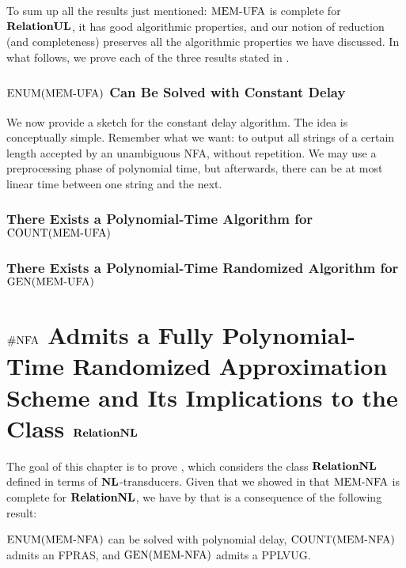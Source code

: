 \documentclass[11pt,twoside=off,numbers=noenddot]{scrbook}
\begin{document}
To sum up all the results just mentioned: $\text{MEM-UFA}$ is complete for $\textbf{RelationUL}$, it has good algorithmic properties, and our notion of reduction (and completeness) preserves all the algorithmic properties we have discussed. In what follows, we prove each of the three results stated in .

\subsection{$\text{ENUM}(\text{MEM-UFA})$ Can Be Solved with Constant Delay}
We now provide a sketch for the constant delay algorithm. The idea is conceptually simple. Remember what we want: to output all strings of a certain length accepted by an unambiguous NFA, without repetition. We may use a preprocessing phase of polynomial time, but afterwards, there can be at most linear time between one string and the next.

\subsection{There Exists a Polynomial-Time Algorithm for $\text{COUNT}(\text{MEM-UFA})$}

\subsection{There Exists a Polynomial-Time Randomized Algorithm for $\text{GEN}(\text{MEM-UFA})$}

\chapter{$\text{\#NFA}$ Admits a Fully Polynomial-Time Randomized Approximation Scheme and Its Implications to the Class $\textbf{RelationNL}$}
The goal of this chapter is to prove , which considers the class $\textbf{RelationNL}$ defined in terms of $\textbf{NL}$-transducers. Given that we showed in  that $\text{MEM-NFA}$ is complete for $\textbf{RelationNL}$, we have by  that  is a consequence of the following result:

\begin{theorem}
    $\text{ENUM}(\text{MEM-NFA})$ can be solved with polynomial delay, $\text{COUNT}(\text{MEM-NFA})$ admits an FPRAS, and $\text{GEN}(\text{MEM-NFA})$ admits a PPLVUG.
\end{theorem}
\end{document}
